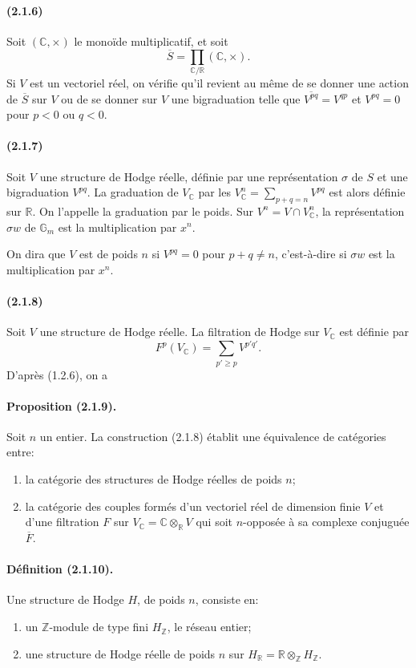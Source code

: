 \documentclass[10pt]{article}
\newcommand{\C}{\mathbb C}
\newcommand{\Z}{\mathbb Z}
\newcommand{\fg}{\guillemotright}
\newcommand{\og}{\guillemotleft}
\newcommand{\R}{\mathbb R}
\newcommand{\Gm}{\mathbb G_m}
\begin{document}
\paragraph{(2.1.6)} Soit $(\C,\times)$ le monoïde multiplicatif, et soit
\[
\overline S=\prod_{\C/\R}(\C,\times).
\]
Si $V$ est un vectoriel réel, on vérifie qu'il revient au même de se donner une action de $\overline S$ sur $V$ ou de se donner sur $V$ une bigraduation telle que $\overline{V^{pq}}=V^{qp}$ et $V^{pq}=0$ pour $p<0$ ou $q<0$.

\paragraph{(2.1.7)} Soit $V$ une structure de Hodge réelle, définie par une représentation $\sigma$ de $S$ et une bigraduation $V^{pq}$. La graduation de $V_\C$ par les $V_\C^n=\sum_{p+q=n}V^{pq}$ est alors définie sur $\R$. On l'appelle la graduation par le poids. Sur $V^n=V\cap V_\C^n$, la représentation $\sigma w$ de $\Gm$ est la multiplication par $x^n$.

On dira que $V$ est de poids $n$ si $V^{pq}=0$ pour $p+q\ne n$, c'est-à-dire si $\sigma w$ est la multiplication par $x^n$.

\paragraph{(2.1.8)} Soit $V$ une structure de Hodge réelle. La filtration de Hodge sur $V_\C$ est définie par
\[
F^p(V_\C)=\sum_{p'\ge p}V^{p'q'}.
\]
D'après (1.2.6), on a

\paragraph{Proposition (2.1.9).} Soit $n$ un entier. La construction (2.1.8) établit une équivalence de catégories entre:
\begin{enumerate}[label=\alph*)]
\item la catégorie des structures de Hodge réelles de poids $n$;
\item la catégorie des couples formés d'un vectoriel réel de dimension finie $V$ et d'une filtration $F$ sur $V_\C=\C\otimes_\R V$ qui soit $n$-opposée à sa complexe conjuguée $\overline F$.
\end{enumerate}

\paragraph{Définition (2.1.10).} Une structure de Hodge $H$, de poids $n$, consiste en:
\begin{enumerate}[label=\alph*)]
\item un $\Z$-module de type fini $H_\Z$, le \og réseau entier\fg;
\item une structure de Hodge réelle de poids $n$ sur $H_\R=\R\otimes_\Z H_\Z$.
\end{enumerate}
\end{document}
